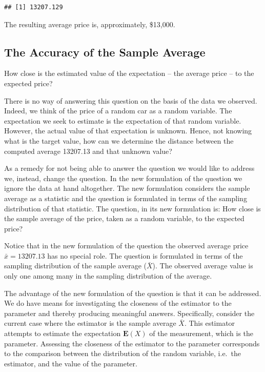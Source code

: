 \documentclass[]{krantz}
\makeatletter
\newenvironment{Shaded}{\begin{snugshade}}{\end{snugshade}}
\newcommand{\DataTypeTok}[1]{\textcolor[rgb]{0.13,0.29,0.53}{#1}}
\newcommand{\KeywordTok}[1]{\textcolor[rgb]{0.13,0.29,0.53}{\textbf{#1}}}
\newcommand{\NormalTok}[1]{#1}
\newcommand{\OperatorTok}[1]{\textcolor[rgb]{0.81,0.36,0.00}{\textbf{#1}}}
\newcommand{\OtherTok}[1]{\textcolor[rgb]{0.56,0.35,0.01}{#1}}
\newcommand{\Expec}{\mathbf{E}}
\newenvironment{kframe}{%
\medskip{}
\setlength{\fboxsep}{.8em}
 \def\at@end@of@kframe{}%
 \ifinner\ifhmode%
  \def\at@end@of@kframe{\end{minipage}}%
  \begin{minipage}{\columnwidth}%
 \fi\fi%
 \def\FrameCommand##1{\hskip\@totalleftmargin \hskip-\fboxsep
 \colorbox{shadecolor}{##1}\hskip-\fboxsep
     \hskip-\linewidth \hskip-\@totalleftmargin \hskip\columnwidth}%
 \MakeFramed {\advance\hsize-\width
   \@totalleftmargin\z@ \linewidth\hsize
   \@setminipage}}%
 {\par\unskip\endMakeFramed%
 \at@end@of@kframe}
\renewenvironment{Shaded}{\begin{kframe}}{\end{kframe}}
\theoremstyle{definition}
\theoremstyle{definition}
\theoremstyle{definition}
\theoremstyle{remark}
\makeatother
\begin{document}
\begin{Shaded}
\end{Shaded}

\begin{verbatim}
## [1] 13207.129
\end{verbatim}

The resulting average price is, approximately, \$13,000.

\hypertarget{the-accuracy-of-the-sample-average}{%
\subsection{The Accuracy of the Sample Average}\label{the-accuracy-of-the-sample-average}}

How close is the estimated value of the expectation -- the average price
-- to the expected price?

There is no way of answering this question on the basis of the data we
observed. Indeed, we think of the price of a random car as a random
variable. The expectation we seek to estimate is the expectation of that
random variable. However, the actual value of that expectation is
unknown. Hence, not knowing what is the target value, how can we
determine the distance between the computed average 13207.13 and that
unknown value?

As a remedy for not being able to answer the question we would like to
address we, instead, change the question. In the new formulation of the
question we ignore the data at hand altogether. The new formulation
considers the sample average as a statistic and the question is
formulated in terms of the sampling distribution of that statistic. The
question, in its new formulation is: How close is the sample average of
the price, taken as a random variable, to the expected price?

Notice that in the new formulation of the question the observed average
price \(\bar x = 13207.13\) has no special role. The question is
formulated in terms of the sampling distribution of the sample average
(\(\bar X\)). The observed average value is only one among many in the
sampling distribution of the average.

The advantage of the new formulation of the question is that it can be
addressed. We do have means for investigating the closeness of the
estimator to the parameter and thereby producing meaningful answers.
Specifically, consider the current case where the estimator is the
sample average \(\bar X\). This estimator attempts to estimate the
expectation \(\Expec(X)\) of the measurement, which is the parameter.
Assessing the closeness of the estimator to the parameter corresponds to
the comparison between the distribution of the random variable, i.e.~the
estimator, and the value of the parameter.
\end{document}
